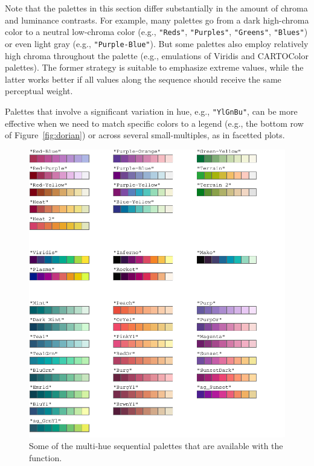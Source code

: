 Note that the palettes in this section
differ substantially in the amount of chroma
and luminance contrasts. For example, many palettes go from a dark
high-chroma color to a neutral low-chroma color (e.g., \texttt{"Reds"},
\texttt{"Purples"}, \texttt{"Greens"}, \texttt{"Blues"}) or even light gray (e.g.,
\texttt{"Purple-Blue"}). But some palettes also employ relatively high chroma
throughout the palette (e.g., emulations of Viridis and CARTOColor palettes).
The former strategy is suitable to
emphasize extreme values,
while the latter works better if all values along the sequence should
receive the same perceptual weight.

Palettes that involve a
significant variation in hue, e.g., \texttt{"YlGnBu"}, can be more effective
when we need to match specific colors to a legend
(e.g., the bottom row of Figure~\ref{fig:dorian}) or across several
small-multiples, as in facetted plots.

\begin{figure}[ht!]

{\centering \includegraphics[width=1\linewidth]{color_files/figure-latex/multiSeqPalettes-1} 

}

\caption{Some of the multi-hue sequential palettes that are available with the  function.}\label{fig:multiSeqPalettes}
\end{figure}

